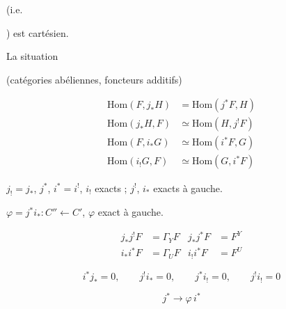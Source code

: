 \documentclass[11pt,a4paper]{article}
\begin{document}
(i.e.


) est cartésien.

La situation


(catégories abéliennes, foncteurs additifs)

\begin{align*}
  \mathrm{Hom}(F, j_{*}H) &= \mathrm{Hom}(j^{*}F, H) \\
  \mathrm{Hom}(j_{*}H, F) &\simeq \mathrm{Hom}(H, j^{!}F) \\
  \mathrm{Hom}(F, i_{*}G) &\simeq \mathrm{Hom}(i^{*}F, G) \\
  \mathrm{Hom}(i_{!}G, F) &\simeq \mathrm{Hom}(G, i^{*}F)
\end{align*}

$j_{!} = j_{*}$, $j^{*}$, $i^{*} = i^{!}$, $i_{!}$ exacts ; $j^{!}$, $i_{*}$
exacts à gauche.

$\varphi = j^{*} i_{*} : C'' \longleftarrow C'$, \quad $\varphi$ exact à
gauche.

\begin{align*}
  j_{*} j^{!} F &= \Gamma_{Y} F & j_{*} j^{*} F &= F^{Y} \\
  i_{*} i^{*} F &= \Gamma_{U} F & i_{!} i^{*} F &= F^{U}
\end{align*}

\[
  i^{*} j_{*} = 0, \qquad j^{!} i_{*} = 0, \qquad
  j^{*} i_{!} = 0, \qquad j^{!} i_{!} = 0
\]

\[
  j^{*} \longrightarrow \varphi\, i^{*}
\]
\end{document}

